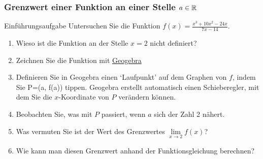 \clearpage
\subsubsection{Grenzwert einer Funktion an einer Stelle \texorpdfstring{$a\in \mathbb{R}$}{a}}
\begin{LA}
    {Einführungsaufgabe}{}
    Untersuchen Sie die Funktion $f(x)=\frac{x^3+10x^2-24x}{7x-14}$. 
        \begin{enumerate}
            \item Wieso ist die Funktion an der Stelle $x=2$ nicht definiert?
            \item Zeichnen Sie die Funktion mit \href{https://www.geogebra.org/calculator}{Geogebra}
            \item Definieren Sie in Geogebra einen `Laufpunkt' auf dem Graphen von $f$, indem Sie P=(a, f(a)) tippen. Geogebra erstellt automatisch einen Schieberegler, mit dem Sie die $x$-Koordinate von $P$ verändern können.
            \item  Beobachten Sie, was mit $P$ passiert, wenn $a$ sich der Zahl 2 nähert.
            \item  Was vermuten Sie ist der Wert des Grenzwertes $\lim\limits_{x\to 2} f(x)$?
            \item  Wie kann man diesen Grenzwert anhand der Funktionsgleichung berechnen?
        \end{enumerate}



                  
                  

\end{LA}
